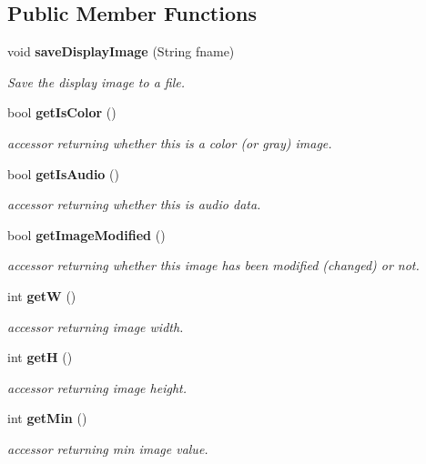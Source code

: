 \subsection*{Public Member Functions}
\begin{CompactItemize}
\item 
void {\bf save\-Display\-Image} (String fname)
\begin{CompactList}\small\item\em Save the display image to a file. \item\end{CompactList}\item 
bool {\bf get\-Is\-Color} ()
\begin{CompactList}\small\item\em accessor returning whether this is a color (or gray) image. \item\end{CompactList}\item 
bool {\bf get\-Is\-Audio} ()
\begin{CompactList}\small\item\em accessor returning whether this is audio data. \item\end{CompactList}\item 
bool {\bf get\-Image\-Modified} ()
\begin{CompactList}\small\item\em accessor returning whether this image has been modified (changed) or not. \item\end{CompactList}\item 
int {\bf get\-W} ()
\begin{CompactList}\small\item\em accessor returning image width. \item\end{CompactList}\item 
int {\bf get\-H} ()
\begin{CompactList}\small\item\em accessor returning image height. \item\end{CompactList}\item 
int {\bf get\-Min} ()
\begin{CompactList}\small\item\em accessor returning min image value. \item\end{CompactList}\item 

\end{CompactItemize}
